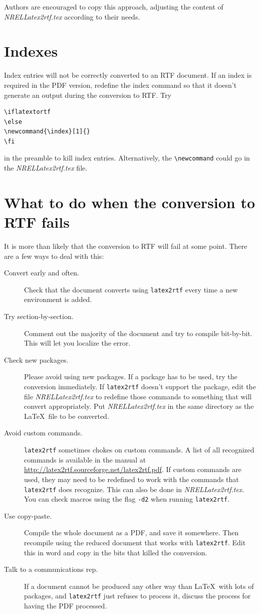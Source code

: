 \documentclass[12pt,letterpaper]{report}
\begin{document}
Authors are encouraged to copy this approach, adjusting the content of \emph{NRELLatex2rtf.tex} according to their needs. 

\section{Indexes}
Index entries will not be correctly converted to an RTF document. If an index is required in the PDF version, redefine the index command so that it doesn't generate an output during the conversion to RTF. Try

\begin{verbatim}
\iflatextortf
\else
\newcommand{\index}[1]{}
\fi
\end{verbatim}

in the preamble to kill index entries. Alternatively, the \verb+\newcommand+ could go in the  \emph{NRELLatex2rtf.tex} file.

\section{What to do when the conversion to RTF fails}
It is more than likely that the conversion to RTF will fail at some point. There are a few ways to deal with this:

\begin{description}
\item[Convert early and often.] Check that the document converts using \texttt{latex2rtf} every time a new environment is added.
\item[Try section-by-section.] Comment out the majority of the document and try to compile bit-by-bit. This will let you localize the error.
\item[Check new packages.] Please avoid using new packages. If a package has to be used, try the conversion immediately. If \texttt{latex2rtf} doesn't support the package, edit the file \emph{NRELLatex2rtf.tex} to redefine those commands to something that will convert appropriately. Put \emph{NRELLatex2rtf.tex} in the same directory as the \LaTeX\ file to be converted.
\item[Avoid custom commands.] \texttt{latex2rtf} sometimes chokes on custom commands. A list of all recognized commands is available in the manual at \url{http://latex2rtf.sourceforge.net/latex2rtf.pdf}. If custom commands are used, they may need to be redefined to work with the commands that \texttt{latex2rtf} does recognize. This can also be done in \emph{NRELLatex2rtf.tex}. You can check macros using the flag \verb+-d2+ when running \texttt{latex2rtf}.
\item[Use copy-paste.] Compile the whole document as a PDF, and save it somewhere. Then recompile using the reduced document that works with \texttt{latex2rtf}. Edit this in word and copy in the bits that killed the conversion.
\item[Talk to a communications rep.] If a document cannot be produced any other way than \LaTeX\ with lots of packages, and \texttt{latex2rtf} just refuses to process it, discuss the process for having the PDF processed.
\end{description}
\end{document}
